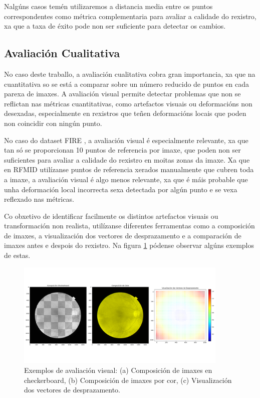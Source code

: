 Nalgúns casos temén utilizaremos a distancia media entre os puntos correspondentes como métrica complementaria para avaliar a calidade do rexistro, xa que a taxa de éxito pode non ser suficiente para detectar os cambios.

\subsection{Avaliación Cualitativa}
\label{subsec:Avaliación Cualitativa}

No caso deste traballo, a avaliación cualitativa cobra gran importancia, xa que na cuantitativa so se está a comparar sobre un número reducido de puntos en cada parexa de imaxes.
A avaliación visual permite detectar problemas que non se reflictan nas métricas cuantitativas, como artefactos visuais ou deformacións non desexadas, 
especialmente en rexistros que teñen deformacións locais que poden non coincidir con ningún punto.

No caso do dataset FIRE \cite{FIRE}, a avaliación visual é especialmente relevante, xa que tan só se proporcionan 10 puntos de referencia por imaxe, que poden non ser suficientes para avaliar a calidade do rexistro en moitas zonas da imaxe.
Xa que en RFMID \cite{RFMiD} utilízanse puntos de referencia xerados manualmente que cubren toda a imaxe, a avaliación visual é algo menos relevante, xa que é máis probable que unha deformación local incorrecta sexa detectada por algún punto e se vexa reflexado nas métricas.

Co obxetivo de identificar facilmente os distintos artefactos visuais ou transformación non realista, utilízanse diferentes ferramentas como a composición de imaxes, a visualización dos vectores de desprazamento e a comparación de imaxes antes e despois do rexistro.
Na figura \ref{fig:visex} pódense observar algúns exemplos de estas.

\begin{figure}[ht]
    \centering
    \includegraphics[width=0.9\textwidth]{imaxes/visex.png}
    \caption{Exemplos de avaliación visual: (a) Composición de imaxes en checkerboard, (b) Composición de imaxes por cor, (c) Visualización dos vectores de desprazamento.}
    \label{fig:visex}
\end{figure}